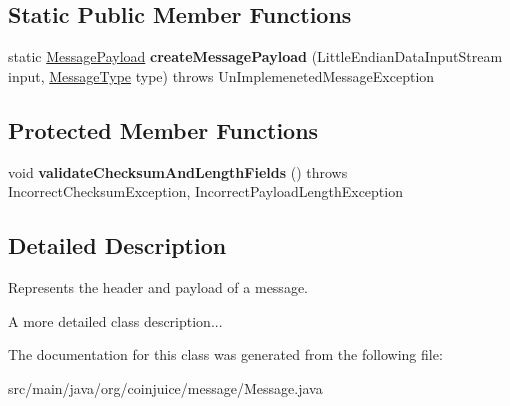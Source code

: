 \subsection*{Static Public Member Functions}
\begin{DoxyCompactItemize}
\item 
\hypertarget{classorg_1_1coinjuice_1_1message_1_1_message_a15ca0920591dc798e2eda6db642dab79}{static \hyperlink{classorg_1_1coinjuice_1_1message_1_1_message_payload}{Message\-Payload} {\bfseries create\-Message\-Payload} (Little\-Endian\-Data\-Input\-Stream input, \hyperlink{enumorg_1_1coinjuice_1_1message_1_1_message_type}{Message\-Type} type)  throws Un\-Implemeneted\-Message\-Exception }\label{classorg_1_1coinjuice_1_1message_1_1_message_a15ca0920591dc798e2eda6db642dab79}

\end{DoxyCompactItemize}
\subsection*{Protected Member Functions}
\begin{DoxyCompactItemize}
\item 
\hypertarget{classorg_1_1coinjuice_1_1message_1_1_message_af58273e4b14385cb958c976a6e1fcef7}{void {\bfseries validate\-Checksum\-And\-Length\-Fields} ()  throws Incorrect\-Checksum\-Exception, Incorrect\-Payload\-Length\-Exception }\label{classorg_1_1coinjuice_1_1message_1_1_message_af58273e4b14385cb958c976a6e1fcef7}

\end{DoxyCompactItemize}


\subsection{Detailed Description}
Represents the header and payload of a message. 

A more detailed class description... 

The documentation for this class was generated from the following file\-:\begin{DoxyCompactItemize}
\item 
src/main/java/org/coinjuice/message/Message.\-java\end{DoxyCompactItemize}
